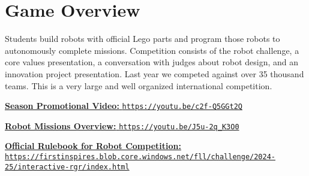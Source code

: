 \documentclass[letter]{article}
\begin{document}
\begin{center}
\end{center}

\hypertarget{game-overview}{%
\section{Game Overview}\label{game-overview}}

Students build robots with official Lego parts and program those robots to autonomously complete missions. Competition consists of the robot challenge, a core values presentation, a conversation with judges about robot design, and an innovation project presentation.  Last year we competed against over 35 thousand teams.  This is a very large and well organized international competition.

\href{https://youtu.be/c2f-Q5GGt2Q}{\textbf{Season Promotional Video:} \nolinkurl{https://youtu.be/c2f-Q5GGt2Q}}

\href{https://youtu.be/J5u-2q_K3O0}{\textbf{Robot Missions Overview:} \nolinkurl{https://youtu.be/J5u-2q_K3O0}}

\href{https://firstinspires.blob.core.windows.net/fll/challenge/2024-25/interactive-rgr/index.html}{\textbf{Official Rulebook for Robot Competition:} \nolinkurl{https://firstinspires.blob.core.windows.net/fll/challenge/2024-25/interactive-rgr/index.html}}
\end{document}
